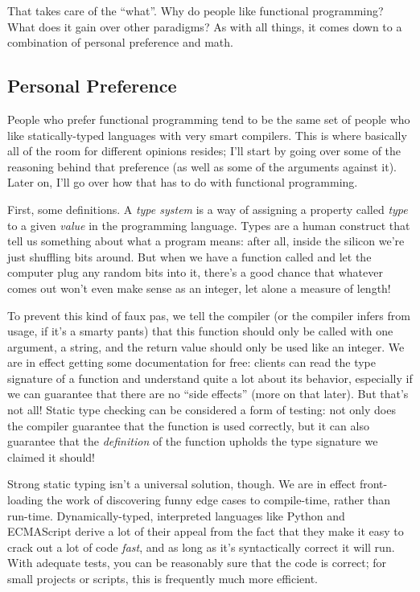 That takes care of the ``what''. Why do people like functional programming? What does it gain over other paradigms? As with all things, it comes down to a combination of personal preference and math.

\subsection{Personal Preference}

People who prefer functional programming tend to be the same set of people who like statically-typed languages with very smart compilers. This is where basically all of the room for different opinions resides; I'll start by going over some of the reasoning behind that preference (as well as some of the arguments against it). Later on, I'll go over how that has to do with functional programming.

First, some definitions. A \emph{type system} is a way of assigning a property called \emph{type} to a given \emph{value} in the programming language. Types are a human construct that tell us something about what a program means: after all, inside the silicon we're just shuffling bits around. But when we have a function called  and let the computer plug any random bits into it, there's a good chance that whatever comes out won't even make sense as an integer, let alone a measure of length!

To prevent this kind of faux pas, we tell the compiler (or the compiler infers from usage, if it's a smarty pants) that this function should only be called with one argument, a string, and the return value should only be used like an integer. We are in effect getting some documentation for free: clients can read the type signature of a function and understand quite a lot about its behavior, especially if we can guarantee that there are no ``side effects'' (more on that later). But that's not all! Static type checking can be considered a form of testing: not only does the compiler guarantee that the function is used correctly, but it can also guarantee that the \emph{definition} of the function upholds the type signature we claimed it should!

Strong static typing isn't a universal solution, though. We are in effect front-loading the work of discovering funny edge cases to compile-time, rather than run-time. Dynamically-typed, interpreted languages like Python and ECMAScript derive a lot of their appeal from the fact that they make it easy to crack out a lot of code \emph{fast}, and as long as it's syntactically correct it will run. With adequate tests, you can be reasonably sure that the code is correct; for small projects or scripts, this is frequently much more efficient.

